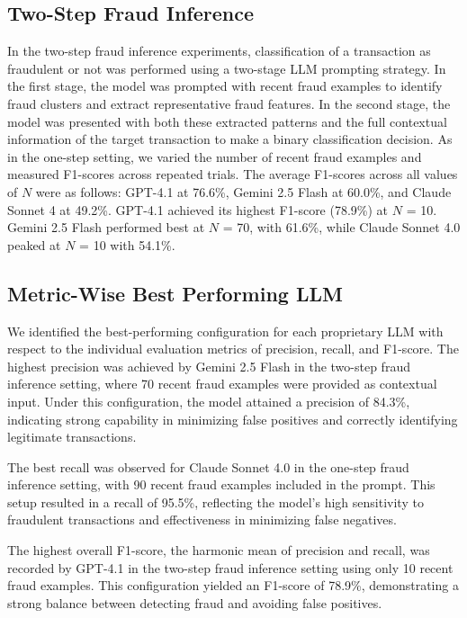 \documentclass[sigconf]{acmart}
\begin{document}
\subsection{Two-Step Fraud Inference}
In the two-step fraud inference experiments, classification of a transaction as fraudulent or not was performed using a two-stage LLM prompting strategy. In the first stage, the model was prompted with recent fraud examples to identify fraud clusters and extract representative fraud features. In the second stage, the model was presented with both these extracted patterns and the full contextual information of the target transaction to make a binary classification decision.
As in the one-step setting, we varied the number of recent fraud examples and measured F1-scores across repeated trials. The average F1-scores across all values of $N$ were as follows: GPT-4.1 at 76.6\%, Gemini 2.5 Flash at 60.0\%, and Claude Sonnet 4 at 49.2\%.
GPT-4.1 achieved its highest F1-score (78.9\%) at $N$ = 10. Gemini 2.5 Flash performed best at $N$ = 70, with 61.6\%, while Claude Sonnet 4.0 peaked at $N$ = 10 with 54.1\%.

\subsection{Metric-Wise Best Performing LLM}
We identified the best-performing configuration for each proprietary LLM with respect to the individual evaluation metrics of precision, recall, and F1-score.
The highest precision was achieved by Gemini 2.5 Flash in the two-step fraud inference setting, where 70 recent fraud examples were provided as contextual input. Under this configuration, the model attained a precision of 84.3\%, indicating strong capability in minimizing false positives and correctly identifying legitimate transactions.

The best recall was observed for Claude Sonnet 4.0 in the one-step fraud inference setting, with 90 recent fraud examples included in the prompt. This setup resulted in a recall of 95.5\%, reflecting the model's high sensitivity to fraudulent transactions and effectiveness in minimizing false negatives.

The highest overall F1-score, the harmonic mean of precision and recall, was recorded by GPT-4.1 in the two-step fraud inference setting using only 10 recent fraud examples. This configuration yielded an F1-score of 78.9\%, demonstrating a strong balance between detecting fraud and avoiding false positives.
\end{document}
